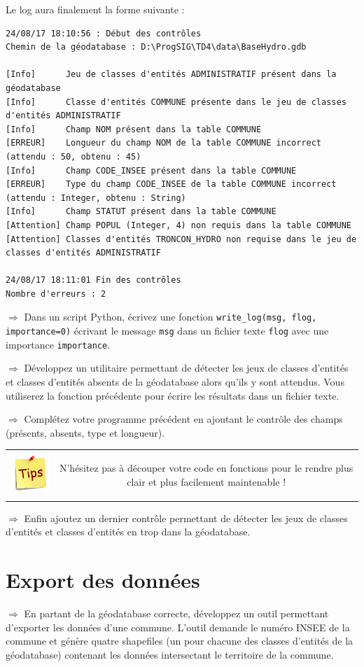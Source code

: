 \documentclass[11pt]{article}
\newcommand{\action}{$\Rightarrow$ }
\newenvironment{note}{%
	\begin{tabular}[t t]{c c}
		\includegraphics{img/tips.png}
		 &
		\begin{minipage}[c]{0.9\linewidth}
			\begin{sffamily}
}{%
			\end{sffamily}
		\end{minipage}
	\end{tabular}	
}
\newcommand{\code}[1]{\lstinline{#1}}
\begin{document}
Le log aura finalement la forme suivante : 
\begin{Verbatim}[fontsize=\scriptsize]
24/08/17 18:10:56 : Début des contrôles
Chemin de la géodatabase : D:\ProgSIG\TD4\data\BaseHydro.gdb

[Info]		Jeu de classes d'entités ADMINISTRATIF présent dans la géodatabase
[Info]		Classe d'entités COMMUNE présente dans le jeu de classes d'entités ADMINISTRATIF
[Info]		Champ NOM présent dans la table COMMUNE
[ERREUR]	Longueur du champ NOM de la table COMMUNE incorrect (attendu : 50, obtenu : 45)
[Info]		Champ CODE_INSEE présent dans la table COMMUNE
[ERREUR]	Type du champ CODE_INSEE de la table COMMUNE incorrect (attendu : Integer, obtenu : String)
[Info]		Champ STATUT présent dans la table COMMUNE
[Attention]	Champ POPUL (Integer, 4) non requis dans la table COMMUNE
[Attention]	Classes d'entités TRONCON_HYDRO non requise dans le jeu de classes d'entités ADMINISTRATIF

24/08/17 18:11:01 Fin des contrôles
Nombre d'erreurs : 2
\end{Verbatim}

\action Dans un script Python, écrivez une fonction \code{write_log(msg, flog, importance=0)} écrivant le message \code{msg} dans un fichier texte \code{flog} avec une importance \code{importance}.

\action Développez un utilitaire permettant de détecter les jeux de classes d'entités et classes d'entités absents de la géodatabase alors qu'ils y sont attendus. Vous utiliserez la fonction précédente pour écrire les résultats dans un fichier texte.

\action Complétez votre programme précédent en ajoutant le contrôle des champs (présents, absents, type et longueur).

\begin{note}
N'hésitez pas à découper votre code en fonctions pour le rendre plus clair et plus facilement maintenable !
\end{note}

\action Enfin ajoutez un dernier contrôle permettant de détecter les jeux de classes d'entités et classes d'entités en trop dans la géodatabase.



\section{Export des données}

\action En partant de la géodatabase correcte, développez un outil permettant d'exporter les données d'une commune. L'outil demande le numéro INSEE de la commune et génère quatre shapefiles (un pour chacune des classes d'entités de la géodatabase) contenant les données intersectant le territoire de la commune.
\end{document}
